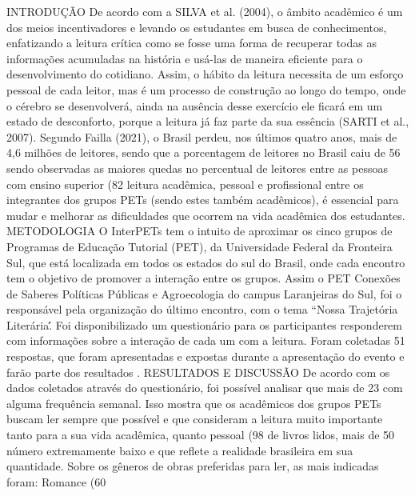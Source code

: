 INTRODUÇÃO
De acordo com a SILVA et al. (2004), o âmbito acadêmico é um dos meios
incentivadores e levando os estudantes em busca de conhecimentos, enfatizando a leitura crítica
como se fosse uma forma de recuperar todas as informações acumuladas na história e usá-las de
maneira eficiente para o desenvolvimento do cotidiano. Assim, o hábito da leitura necessita de
um esforço pessoal de cada leitor, mas é um processo de construção ao longo do tempo, onde o
cérebro se desenvolverá, ainda na ausência desse exercício ele ficará em um estado de
desconforto, porque a leitura já faz parte da sua essência (SARTI et al., 2007).
Segundo Failla (2021), o Brasil perdeu, nos últimos quatro anos, mais de 4,6 milhões de
leitores, sendo que a porcentagem de leitores no Brasil caiu de 56%
sendo observadas as maiores quedas no percentual de leitores entre as pessoas com ensino
superior (82%
leitura acadêmica, pessoal e profissional entre os integrantes dos grupos PETs (sendo estes
também acadêmicos), é essencial para mudar e melhorar as dificuldades que ocorrem na vida
acadêmica dos estudantes.
METODOLOGIA
O InterPETs tem o intuito de aproximar os cinco grupos de Programas de Educação
Tutorial (PET), da Universidade Federal da Fronteira Sul, que está localizada em todos os
estados do sul do Brasil, onde cada encontro tem o objetivo de promover a interação entre os
grupos. Assim o PET Conexões de Saberes Políticas Públicas e Agroecologia do campus
Laranjeiras do Sul, foi o responsável pela organização do último encontro, com o tema “Nossa
Trajetória Literária\'\'.
Foi disponibilizado um questionário para os participantes responderem com informações
sobre a interação de cada um com a leitura. Foram coletadas 51 respostas, que foram
apresentadas e expostas durante a apresentação do evento e farão parte dos resultados .
RESULTADOS E DISCUSSÃO
De acordo com os dados coletados através do questionário, foi possível analisar que mais
de 23%
com alguma frequência semanal. Isso mostra que os acadêmicos dos grupos PETs buscam ler
sempre que possível e que consideram a leitura muito importante tanto para a sua vida
acadêmica, quanto pessoal (98%
de livros lidos, mais de 50%
número extremamente baixo e que reflete a realidade brasileira em sua quantidade. Sobre os
gêneros de obras preferidas para ler, as mais indicadas foram: Romance (60%
